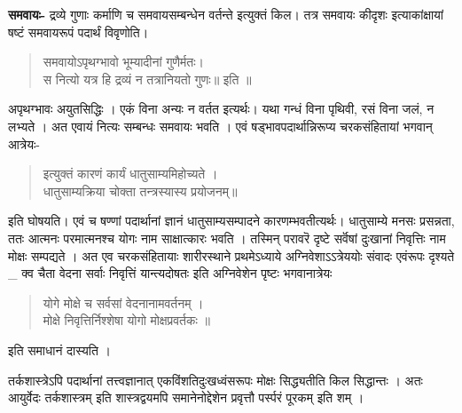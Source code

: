 \textbf{समवायः-} द्रव्ये गुणाः कर्माणि च समवायसम्बन्धेन वर्तन्ते इत्युक्तं किल। तत्र समवायः कीदृशः इत्याकांक्षायां षष्टं समवायरूपं पदार्थं विवृणोति।
\begin{verse}
समवायोऽपृथग्भावो भूम्यादीनां गुणैर्मतः।\\
स नित्यो यत्र हि द्रव्यं न तत्रानियतो गुणः॥ इति ॥
\end{verse}
अपृथग्भावः अयुतसिद्धिः । एकं विना अन्यः न वर्तत इत्यर्थः। यथा गन्धं विना पृथिवी, रसं विना जलं, न लभ्यते । अत एवायं नित्यः सम्बन्धः समवायः भवति । एवं षड्भावपदार्थान्निरूप्य चरकसंहितायां भगवान् आत्रेयः-
\begin{verse}
इत्युक्तं कारणं कार्यं धातुसाम्यमिहोच्यते ।\\
धातुसाम्यक्रिया चोक्ता तन्त्रस्यास्य प्रयोजनम्॥
\end{verse}
इति घोषयति। एवं च षण्णां पदार्थानां ज्ञानं धातुसाम्यसम्पादने कारणम्भवतीत्यर्थः। धातुसाम्ये मनसः प्रसन्नता, ततः आत्मनः परमात्मनश्च योगः नाम साक्षात्कारः भवति । तस्मिन् परावरॆ दृष्टे सर्वॆषां दुःखानां निवृत्तिः नाम मोक्षः सम्पद्यते । अत एव चरकसंहितायाः शारीरस्थाने प्रथमेऽध्याये अग्निवेशाऽऽत्रेययोः संवादः एवंरूपः दृश्यते \_ क्व चैता वेदना सर्वाः निवृत्तिं यान्त्यदोषतः इति अग्निवेशेन पृष्टः भगवानात्रेयः
\begin{verse}
योगे मोक्षे च सर्वसां वेदनानामवर्तनम् ।\\
मोक्षे निवृत्तिर्निश्शेषा योगो मोक्षप्रवर्तकः ॥
\end{verse}
इति समाधानं दास्यति ।

तर्कशास्त्रेऽपि पदार्थानां तत्त्वज्ञानात् एकविंशतिदुःखध्वंसरूपः मोक्षः सिद्ध्यतीति किल सिद्धान्तः । अतः आयुर्वेदः तर्कशास्त्रम् इति शास्त्रद्वयमपि समानेनोद्देशेन प्रवृत्तौ पर्स्परं पूरकम् इति शम् ।

\articleend
